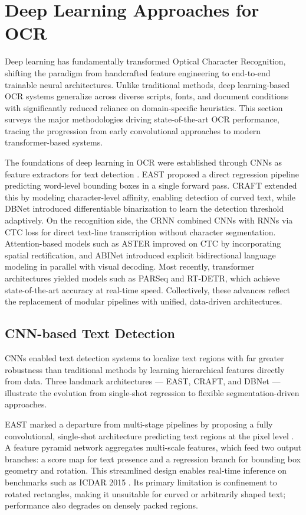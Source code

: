 \section{Deep Learning Approaches for OCR}

Deep learning has fundamentally transformed Optical Character Recognition, shifting the paradigm from handcrafted feature engineering to end-to-end trainable neural architectures. Unlike traditional methods, deep learning-based OCR systems generalize across diverse scripts, fonts, and document conditions with significantly reduced reliance on domain-specific heuristics. This section surveys the major methodologies driving state-of-the-art OCR performance, tracing the progression from early convolutional approaches to modern transformer-based systems.

The foundations of deep learning in OCR were established through CNNs as feature extractors for text detection \cite{LeCun1998}. EAST proposed a direct regression pipeline predicting word-level bounding boxes in a single forward pass. CRAFT extended this by modeling character-level affinity, enabling detection of curved text, while DBNet introduced differentiable binarization to learn the detection threshold adaptively. On the recognition side, the CRNN combined CNNs with RNNs via CTC loss for direct text-line transcription without character segmentation. Attention-based models such as ASTER improved on CTC by incorporating spatial rectification, and ABINet introduced explicit bidirectional language modeling in parallel with visual decoding. Most recently, transformer architectures yielded models such as PARSeq and RT-DETR, which achieve state-of-the-art accuracy at real-time speed. Collectively, these advances reflect the replacement of modular pipelines with unified, data-driven architectures.

\subsection{CNN-based Text Detection}

CNNs enabled text detection systems to localize text regions with far greater robustness than traditional methods by learning hierarchical features directly from data. Three landmark architectures — EAST, CRAFT, and DBNet — illustrate the evolution from single-shot regression to flexible segmentation-driven approaches.

EAST marked a departure from multi-stage pipelines by proposing a fully convolutional, single-shot architecture predicting text regions at the pixel level \cite{Zhou2017}. A feature pyramid network aggregates multi-scale features, which feed two output branches: a score map for text presence and a regression branch for bounding box geometry and rotation. This streamlined design enables real-time inference on benchmarks such as ICDAR 2015 \cite{Karatzas2015}. Its primary limitation is confinement to rotated rectangles, making it unsuitable for curved or arbitrarily shaped text; performance also degrades on densely packed regions.

